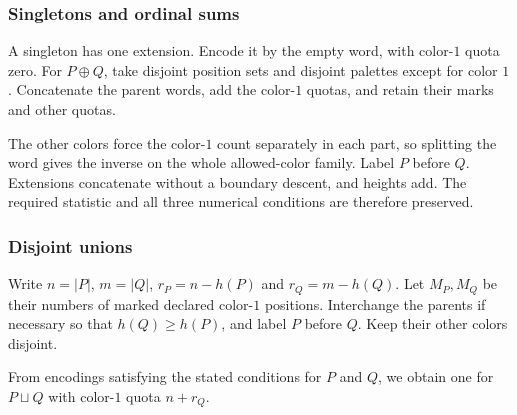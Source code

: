 \subsubsection[seriesParallelBase]{Singletons and ordinal sums}

A singleton has one extension. Encode it by the empty word, with color-$1$
quota zero. For $P\oplus Q$, take disjoint position sets and disjoint
palettes except for color $1$. Concatenate the parent words, add the
color-$1$ quotas, and retain their marks and other quotas.

The other colors force the color-$1$ count separately in each part,
so splitting the word gives the inverse on the whole allowed-color family.
Label $P$ before $Q$. Extensions concatenate without a boundary descent,
and heights add. The required statistic and all three numerical conditions
are therefore preserved.

\subsubsection[seriesParallelUnion]{Disjoint unions}

Write $n=|P|$, $m=|Q|$, $r_P=n-h(P)$ and $r_Q=m-h(Q)$.
Let $M_P,M_Q$ be their numbers of marked declared color-$1$ positions.
Interchange the parents if necessary so that $h(Q)\geq h(P)$, and label
$P$ before $Q$. Keep their other colors disjoint.

\begin{proposition}
From encodings satisfying the stated conditions for $P$ and $Q$, we obtain
one for $P\sqcup Q$ with color-$1$ quota $n+r_Q$.
\end{proposition}

